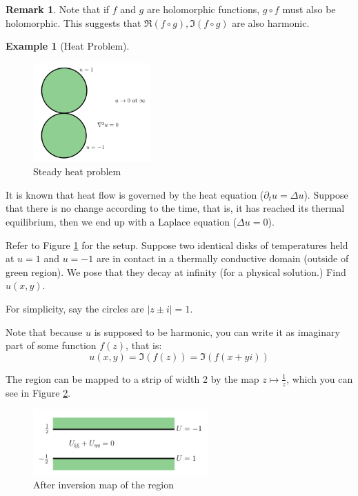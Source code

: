 \documentclass[a4paper, 12pt]{article}
\theoremstyle{definition}
\newtheorem{example}{Example}
\newtheorem{remark}{Remark}
\numberwithin{theorem}{section}
\numberwithin{definition}{section}
\numberwithin{exercise}{section}
\numberwithin{remark}{section}
\numberwithin{figure}{section}
\numberwithin{example}{section}
\begin{document}
\begin{remark}
    Note that if $f$ and $g$ are holomorphic functions,
    $g \circ f$ must also be holomorphic.
    This suggests that $\Re\left( f \circ g \right), \Im \left( f \circ g \right)$
    are also harmonic.
\end{remark}
\begin{example}[Heat Problem]
    \begin{figure}[tbp]
        \centering
        \includegraphics[width=0.4\textwidth]{LaplaceEquation1}
        \caption{Steady heat problem}
        \label{fig: Steady heat problem}
    \end{figure}
    It is known that heat flow is governed by the heat equation ($\partial_t u = \Delta u$).
    Suppose that there is no change according to the time, that is,
    it has reached its thermal equilibrium, then we end up with a Laplace equation ($\Delta u = 0$).

    Refer to Figure \ref{fig: Steady heat problem} for the setup.
    Suppose two identical disks of temperatures held at $u=1$ and $u=-1$
    are in contact in a thermally conductive domain (outside of green region).
    We pose that they decay at infinity (for a physical solution.)
    Find $u(x,y)$.

    For simplicity, say the circles are $|z \pm i| = 1$.

    Note that because $u$ is supposed to be harmonic,
    you can write it as imaginary part of some function $f(z)$, that is:
    \begin{equation*}
        u(x,y) = \Im\left( f(z) \right) = \Im \left( f(x+yi) \right)
    \end{equation*}

    The region can be mapped to a strip of width 2 by the map $z \mapsto \frac{1}{z}$,
    which you can see in Figure \ref{fig: Inversion map of steady heat}.
    \begin{figure}[tbp]
        \centering
        \includegraphics[width=0.6\textwidth]{LaplaceEquation2}
        \caption{After inversion map of the region}
        \label{fig: Inversion map of steady heat}
    \end{figure}
    

\end{example}
\end{document}
